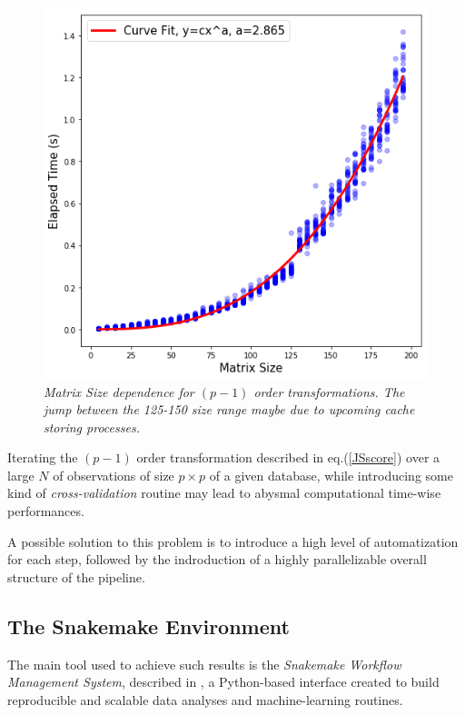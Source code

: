 \documentclass[12pt,openright,twoside,a4paper]{book}
\begin{document}
\begin{figure}[!h]
\centering
\includegraphics[scale=0.5]{RC-timeVsize}
\caption{\textit{Matrix Size dependence for $(p-1)$ order transformations. The jump between the 125-150 size range maybe due to upcoming cache storing processes.}}
\label{timevsize}
\end{figure}

Iterating the $(p-1)$ order transformation described in eq.(\ref{JSscore}) over a large $N$ of observations of size $	p \times p$ of a given database, while introducing some kind of \textit{cross-validation} routine may lead to abysmal computational time-wise performances.

A possible solution to this problem is to introduce a high level of automatization for each step, followed by the indroduction of a highly parallelizable overall structure of the pipeline.

\subsection{The Snakemake Environment}

The main tool used to achieve such results is the \textit{ Snakemake Workflow Management System}, described in \cite{SnakeMake}, a Python-based interface created to build reproducible and scalable data analyses and machine-learning routines.
\end{document}
